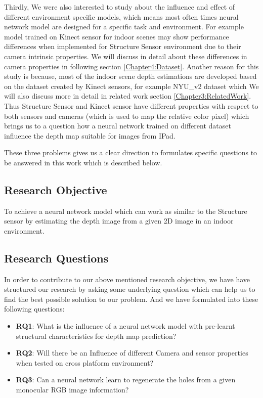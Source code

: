 Thirdly, We were also interested to study about the influence and effect of different environment specific models, which means most often times neural network model are designed for a specific task and environment. For example model trained on Kinect sensor for indoor scenes may show performance differences when implemented for Structure Sensor environment due to their camera intrinsic properties. We will discuss in detail about these differences in camera properties in following section \ref{Chapter4:Dataset}. Another reason for this study is because, most of the indoor scene depth estimations are developed based on the dataset created by Kinect sensors, for example NYU\_v2 dataset \cite{silberman11indoor} which We will also discuss more in detail in related work section \ref{Chapter3:RelatedWork}. Thus Structure Sensor and Kinect sensor have different properties with respect to both sensors and cameras (which is used to map the relative color pixel) which brings us to a question how a neural network trained on different dataset influence the depth map suitable for images from IPad.  

These three problems gives us a clear direction to formulates specific questions to be answered in this work which is described below. 


\subsection{Research Objective}
To achieve a neural network model which can work as similar to the Structure sensor by estimating the depth image from a given 2D image in an indoor environment.

\subsection{Research Questions}
In order to contribute to our above mentioned research objective, we have have structured our research by asking some underlying question which can help us to find the best possible solution to our problem. And we have formulated into these following questions:

\begin{itemize}
    \item \textbf{RQ1}: What is the influence of a neural network model with pre-learnt structural characteristics for depth map prediction?
    \item \textbf{RQ2}: Will there be an Influence of different Camera and sensor properties when tested on cross platform environment?    
    \item \textbf{RQ3}: Can a neural network learn to regenerate the holes from a given monocular RGB image information?
\end{itemize}

